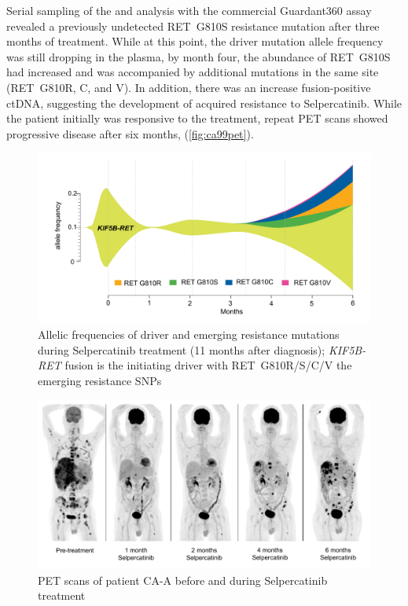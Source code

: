Serial sampling of the  and analysis with the commercial Guardant360 assay \cite{Talasaz2014} revealed a previously undetected RET~G810S resistance mutation after three months of treatment. While at this point, the driver mutation allele frequency was still dropping in the plasma, by month four, the abundance of RET~G810S had increased and was accompanied by additional mutations in the same site (RET~G810R, C, and V). In addition, there was an increase  fusion-positive ctDNA,  suggesting the development of acquired resistance to Selpercatinib. While the patient initially was responsive to the treatment, repeat PET scans showed progressive disease after six months,  (\autoref{fig:ca99pet}).

\begin{figure}[htp]
\centering
\includegraphics[width=.99\linewidth]{Figures/CASCADE/CA99/CA-A_ctDNAstream}
\caption[Allelic frequencies of driver and emerging resistance mutations]{Allelic frequencies of driver and emerging resistance mutations during Selpercatinib treatment (11 months after diagnosis); \textit{KIF5B-RET} fusion is the initiating driver with RET~G810R/S/C/V the emerging resistance SNPs} \label{fig:ca99ctDNA}
\end{figure}


\begin{figure}[hbp]
\centering
\includegraphics[width=.99\linewidth]{Figures/CASCADE/CA99/CA-A_PETscans}
\caption[PET scans of patient CA-A before and during Selpercatinib treatment]{PET scans of patient CA-A before and during Selpercatinib treatment} \label{fig:ca99pet}
\end{figure}


